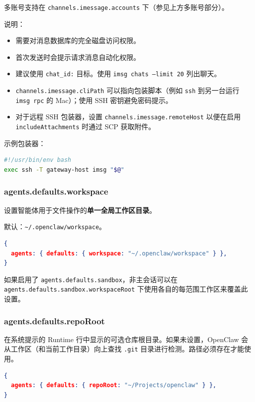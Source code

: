 多账号支持在 \texttt{channels.imessage.accounts} 下（参见上方多账号部分）。

说明：

\begin{itemize}
  \item 需要对消息数据库的完全磁盘访问权限。
  \item 首次发送时会提示请求消息自动化权限。
  \item 建议使用 \texttt{chat\_id:} 目标。使用 \texttt{imsg chats --limit 20} 列出聊天。
  \item \texttt{channels.imessage.cliPath} 可以指向包装脚本（例如 \texttt{ssh} 到另一台运行 \texttt{imsg rpc} 的 Mac）；使用 SSH 密钥避免密码提示。
  \item 对于远程 SSH 包装器，设置 \texttt{channels.imessage.remoteHost} 以便在启用 \texttt{includeAttachments} 时通过 SCP 获取附件。
\end{itemize}


示例包装器：

\begin{lstlisting}[language=bash]
#!/usr/bin/env bash
exec ssh -T gateway-host imsg "$@"
\end{lstlisting}


\subsubsection{agents.defaults.workspace}


设置智能体用于文件操作的\textbf{单一全局工作区目录}。

默认：\texttt{\textasciitilde{}/.openclaw/workspace}。

\begin{lstlisting}[language=json]
{
  agents: { defaults: { workspace: "~/.openclaw/workspace" } },
}
\end{lstlisting}


如果启用了 \texttt{agents.defaults.sandbox}，非主会话可以在 \texttt{agents.defaults.sandbox.workspaceRoot} 下使用各自的每范围工作区来覆盖此设置。

\subsubsection{agents.defaults.repoRoot}


在系统提示的 Runtime 行中显示的可选仓库根目录。如果未设置，OpenClaw 会从工作区（和当前工作目录）向上查找 \texttt{.git} 目录进行检测。路径必须存在才能使用。

\begin{lstlisting}[language=json]
{
  agents: { defaults: { repoRoot: "~/Projects/openclaw" } },
}
\end{lstlisting}


